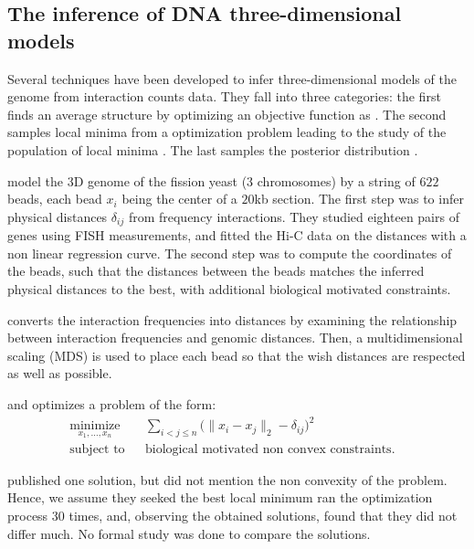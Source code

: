 \subsection{The inference of DNA three-dimensional models}


Several techniques have been developed to infer three-dimensional models of
the genome from interaction counts data. They fall into three categories: the
first finds an average structure by optimizing an objective function as
\citep{tanizawa:mapping, duan:three, ben-elazar:spatial}. The
second samples local minima from a optimization problem leading to the study
of the population of local minima \citep{bau:three-dimensional}. The last
samples the posterior distribution \citep{rousseau:three}.

\citet{tanizawa:mapping} model the 3D genome of the fission yeast (3
chromosomes) by a string of $622$ beads, each bead $x_i$ being the center of a
$20$kb section. The first step was to infer physical distances $\delta_{ij}$
from frequency interactions. They studied eighteen pairs of genes using FISH
measurements, and fitted the Hi-C data on the distances with a non linear
regression curve. The second step was to compute the coordinates of the beads,
such that the distances between the beads matches the inferred physical
distances to the best, with additional biological motivated constraints.

\citet{duan:three} converts the interaction frequencies into distances by
examining the relationship between interaction frequencies and genomic
distances. Then, a multidimensional scaling (MDS) is used to place each bead
so that the wish distances are respected as well as possible.

\citet{tanizawa:mapping} and \citet{duan:three} optimizes a problem of the
form:
\begin{equation*}
\renewcommand{\arraystretch}{2}
\begin{array}{ccll}
\underset{x_1,\ldots, x_n}{\text{minimize}} & &
\underset{i<j\leq n}{\sum} \big(\|x_i - x_j\|_2 - \delta_{ij}\big)^2 &\\
\text{subject to}
& & \text{biological motivated non convex constraints.}
\end{array}
\end{equation*}

\citet{tanizawa:mapping} published one solution, but did not mention the non
convexity of the problem. Hence, we assume they seeked the best local minimum
\citet{duan:three} ran the optimization process 30 times, and, observing the
obtained solutions, found that they did not differ much. No formal study was
done to compare the solutions.

